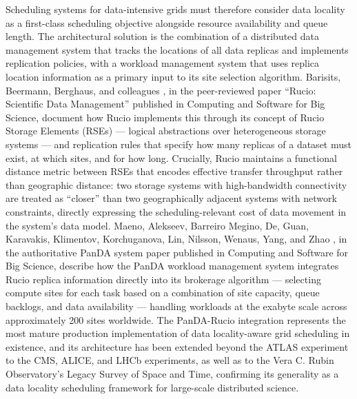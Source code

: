 \documentclass[12pt,a4paper]{report}
\begin{document}
Scheduling systems for data-intensive grids must therefore consider data locality as a first-class scheduling objective alongside resource availability
 and queue length. The architectural solution is the combination of a distributed data management system that tracks the locations of all data replicas 
 and implements replication policies, with a workload management system that uses replica location information as a primary input to its site selection 
 algorithm. Barisits, Beermann, Berghaus, and colleagues \parencite{barisits2019rucio}, in the peer-reviewed paper “Rucio: Scientific Data Management” published in Computing 
 and Software for Big Science, document how Rucio implements this through its concept of Rucio Storage Elements (RSEs) — logical abstractions over
  heterogeneous storage systems — and replication rules that specify how many replicas of a dataset must exist, at which sites, and for how long. 
  Crucially, Rucio maintains a functional distance metric between RSEs that encodes effective transfer throughput rather than geographic distance: 
  two storage systems with high-bandwidth connectivity are treated as “closer” than two geographically adjacent systems with network constraints, 
  directly expressing the scheduling-relevant cost of data movement in the system’s data model. Maeno, Alekseev, Barreiro Megino, De, Guan, Karavakis, 
  Klimentov, Korchuganova, Lin, Nilsson, Wenaus, Yang, and Zhao \parencite{maeno2024panda}, in the authoritative PanDA system paper published in Computing and Software for 
  Big Science, describe how the PanDA workload management system integrates Rucio replica information directly into its brokerage algorithm — selecting
   compute sites for each task based on a combination of site capacity, queue backlogs, and data availability — handling workloads at the exabyte 
   scale across approximately 200 sites worldwide. The PanDA-Rucio integration represents the most mature production implementation of data locality-aware
    grid scheduling in existence, and its architecture has been extended beyond the ATLAS experiment to the CMS, ALICE, and LHCb experiments, as well as to 
    the Vera C. Rubin Observatory’s Legacy Survey of Space and Time, confirming its generality as a data locality scheduling framework for large-scale 
    distributed science.
\end{document}

